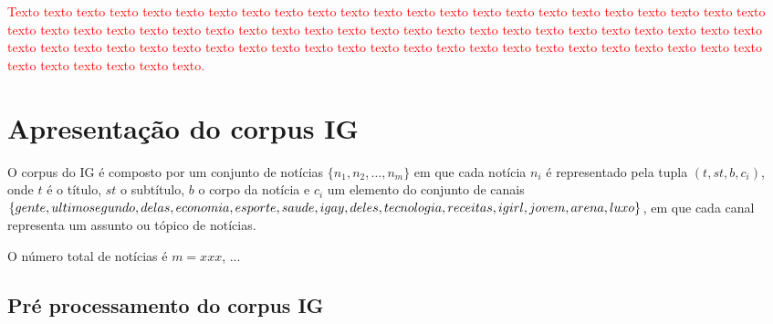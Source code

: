\documentclass[normaltoc, espacoumemeio, pnumromarab,ruledheader]{abnt}
\begin{document}
\textcolor{red}{Texto texto texto texto texto texto texto texto texto texto texto texto texto texto texto texto texto texto texto texto texto texto texto texto texto texto texto texto texto texto texto texto texto texto texto texto texto texto texto texto texto texto texto texto texto texto texto texto texto texto texto texto texto texto texto texto texto texto texto texto texto texto texto texto texto texto texto texto texto texto texto texto texto texto texto.}

\section{Apresentação do corpus IG}


O corpus do IG é composto por um conjunto de notícias $\{ n_1, n_2, \dots, n_m \}$ em que cada notícia $n_i$ é representado pela tupla $(t, st, b, c_i)$, onde $t$ é o título, $st$ o subtítulo, $b$ o corpo da notícia e $c_i$ um elemento do conjunto de canais $\{ gente , ultimosegundo , delas , \\economia , esporte , saude , igay , deles , tecnologia , receitas , igirl , jovem , arena , luxo \}$, em que cada canal representa um assunto ou tópico de notícias.


O número total de notícias é $m = xxx$, ...

\subsection{Pré processamento do corpus IG}
\end{document}
